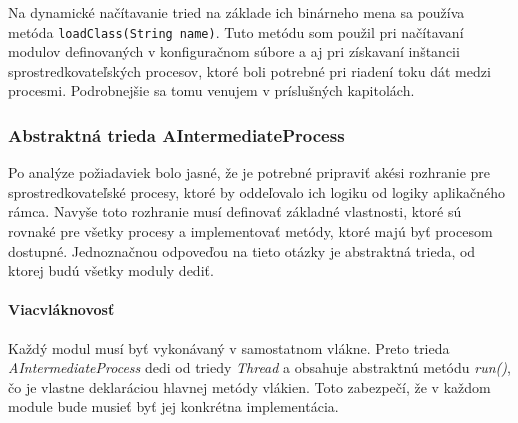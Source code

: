Na dynamické načítavanie tried na základe ich binárneho mena sa používa metóda \verb|loadClass(String name)|.
Tuto metódu som použil pri načítavaní modulov definovaných v konfiguračnom súbore a aj pri získavaní 
inštancii sprostredkovateľských procesov, ktoré boli potrebné pri riadení toku dát medzi procesmi.
Podrobnejšie sa tomu venujem v príslušných kapitolách. 



\subsubsection{Abstraktná trieda AIntermediateProcess} 

Po analýze požiadaviek bolo jasné, že je potrebné pripraviť akési rozhranie pre sprostredkovateľské 
procesy, ktoré by oddeľovalo ich logiku od logiky aplikačného rámca. Navyše toto rozhranie musí 
definovať základné vlastnosti, ktoré sú rovnaké pre všetky procesy a implementovať metódy, ktoré 
majú byť procesom dostupné. Jednoznačnou odpoveďou na tieto otázky je abstraktná trieda, 
od ktorej budú všetky moduly dediť. 


\paragraph{Viacvláknovosť}
Každý modul musí byť vykonávaný v samostatnom vlákne. Preto trieda \emph{AIntermediateProcess} dedi
od triedy \emph{Thread} a obsahuje abstraktnú metódu \emph{run()}, čo je vlastne deklaráciou 
hlavnej metódy vlákien. Toto zabezpečí, že v každom module bude musieť byť jej konkrétna implementácia.


